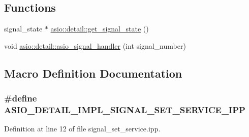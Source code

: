 \subsection*{Functions}
\begin{DoxyCompactItemize}
\item 
signal\+\_\+state $\ast$ \hyperlink{namespaceasio_1_1detail_a36e93386e27cefdbfacb55511fec5dc7}{asio\+::detail\+::get\+\_\+signal\+\_\+state} ()
\item 
void \hyperlink{namespaceasio_1_1detail_a689927725337c59f64507928c894944c}{asio\+::detail\+::asio\+\_\+signal\+\_\+handler} (int signal\+\_\+number)
\end{DoxyCompactItemize}


\subsection{Macro Definition Documentation}
\hypertarget{signal__set__service_8ipp_a611cdd9865cee1cab10b78ba4d7d31c3}{}
\subsubsection[{A\+S\+I\+O\+\_\+\+D\+E\+T\+A\+I\+L\+\_\+\+I\+M\+P\+L\+\_\+\+S\+I\+G\+N\+A\+L\+\_\+\+S\+E\+T\+\_\+\+S\+E\+R\+V\+I\+C\+E\+\_\+\+I\+P\+P}]{\setlength{\rightskip}{0pt plus 5cm}\#define A\+S\+I\+O\+\_\+\+D\+E\+T\+A\+I\+L\+\_\+\+I\+M\+P\+L\+\_\+\+S\+I\+G\+N\+A\+L\+\_\+\+S\+E\+T\+\_\+\+S\+E\+R\+V\+I\+C\+E\+\_\+\+I\+P\+P}\label{signal__set__service_8ipp_a611cdd9865cee1cab10b78ba4d7d31c3}


Definition at line 12 of file signal\+\_\+set\+\_\+service.\+ipp.


